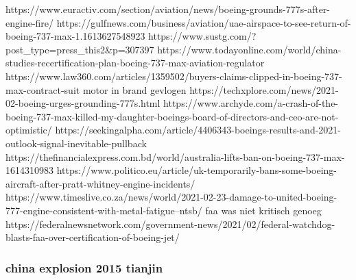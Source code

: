 https://www.euractiv.com/section/aviation/news/boeing-grounds-777s-after-engine-fire/
https://gulfnews.com/business/aviation/uae-airspace-to-see-return-of-boeing-737-max-1.1613627548923
https://www.sustg.com/?post_type=press_this2&p=307397
https://www.todayonline.com/world/china-studies-recertification-plan-boeing-737-max-aviation-regulator
https://www.law360.com/articles/1359502/buyers-claims-clipped-in-boeing-737-max-contract-suit
motor in brand gevlogen
https://techxplore.com/news/2021-02-boeing-urges-grounding-777s.html
https://www.archyde.com/a-crash-of-the-boeing-737-max-killed-my-daughter-boeings-board-of-directors-and-ceo-are-not-optimistic/
https://seekingalpha.com/article/4406343-boeings-results-and-2021-outlook-signal-inevitable-pullback
https://thefinancialexpress.com.bd/world/australia-lifts-ban-on-boeing-737-max-1614310983
https://www.politico.eu/article/uk-temporarily-bans-some-boeing-aircraft-after-pratt-whitney-engine-incidents/
https://www.timeslive.co.za/news/world/2021-02-23-damage-to-united-boeing-777-engine-consistent-with-metal-fatigue--ntsb/
faa was niet kritisch genoeg
https://federalnewsnetwork.com/government-news/2021/02/federal-watchdog-blasts-faa-over-certification-of-boeing-jet/





\subsubsection{china explosion 2015 tianjin}


